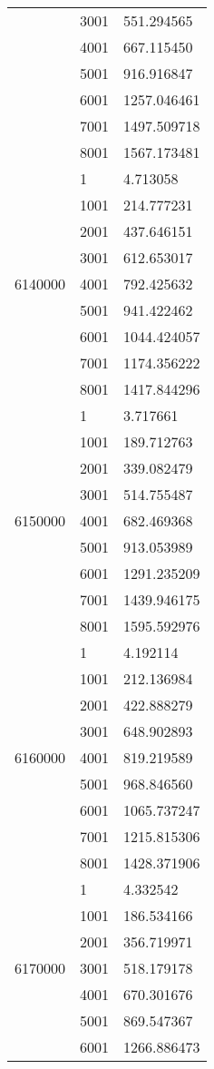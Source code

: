 \begin{table}[htb!]
\begin{tabular}{lll}
 & 3001 & 551.294565 \\
 & 4001 & 667.115450 \\
 & 5001 & 916.916847 \\
 & 6001 & 1257.046461 \\
 & 7001 & 1497.509718 \\
 & 8001 & 1567.173481 \\
\multirow[c]{9}{*}{6140000} & 1 & 4.713058 \\
 & 1001 & 214.777231 \\
 & 2001 & 437.646151 \\
 & 3001 & 612.653017 \\
 & 4001 & 792.425632 \\
 & 5001 & 941.422462 \\
 & 6001 & 1044.424057 \\
 & 7001 & 1174.356222 \\
 & 8001 & 1417.844296 \\
\multirow[c]{9}{*}{6150000} & 1 & 3.717661 \\
 & 1001 & 189.712763 \\
 & 2001 & 339.082479 \\
 & 3001 & 514.755487 \\
 & 4001 & 682.469368 \\
 & 5001 & 913.053989 \\
 & 6001 & 1291.235209 \\
 & 7001 & 1439.946175 \\
 & 8001 & 1595.592976 \\
\multirow[c]{9}{*}{6160000} & 1 & 4.192114 \\
 & 1001 & 212.136984 \\
 & 2001 & 422.888279 \\
 & 3001 & 648.902893 \\
 & 4001 & 819.219589 \\
 & 5001 & 968.846560 \\
 & 6001 & 1065.737247 \\
 & 7001 & 1215.815306 \\
 & 8001 & 1428.371906 \\
\multirow[c]{9}{*}{6170000} & 1 & 4.332542 \\
 & 1001 & 186.534166 \\
 & 2001 & 356.719971 \\
 & 3001 & 518.179178 \\
 & 4001 & 670.301676 \\
 & 5001 & 869.547367 \\
 & 6001 & 1266.886473 \\

\end{tabular}
\end{table}
